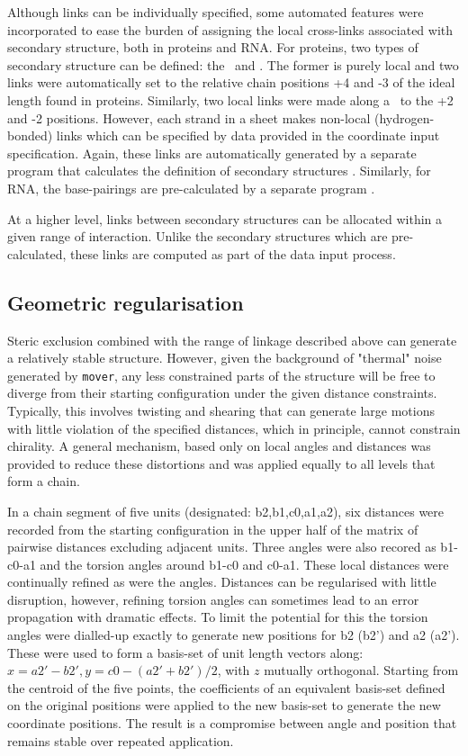 Although links can be individually specified, some automated features were 
incorporated to ease the burden of assigning the local cross-links associated with
secondary structure, both in proteins and RNA.  For proteins, two types of secondary
structure can be defined: the \AH\ and \BS.   The former is purely local and two
links were automatically set to the relative chain positions +4 and -3 of the 
ideal length found in proteins.  Similarly, two local links were made along a \Bs\
to the +2 and -2 positions.   However, each strand in a sheet makes non-local (hydrogen-bonded)
links which can be specified by data provided in the coordinate input specification.
Again, these links are automatically generated by a separate program that calculates the
definition of secondary structures \cite{TaylorWR01a}.    Similarly, for RNA, the base-pairings are
pre-calculated by a separate program \cite{HofackerIL03}.

At a higher level, links between secondary structures can be allocated within a
given range of interaction.   Unlike the secondary structures which are pre-calculated,
these links are computed as part of the data input process.

\subsection{Geometric regularisation}

Steric exclusion combined with the range of linkage described above can generate a
relatively stable structure.   However, given the background of "thermal" noise generated by {\tt mover}, 
any less constrained parts of the structure will be free to diverge from their starting
configuration under the given distance constraints.  Typically, this involves twisting
and shearing that can generate large motions with little violation of the specified
distances, which in principle, cannot constrain chirality.  A general mechanism,
based only on local angles and distances was provided to reduce these distortions
and was applied equally to all levels that form a chain.

In a chain segment of five units (designated: b2,b1,c0,a1,a2), six distances were
recorded from the starting configuration in the upper half of the matrix of pairwise
distances excluding adjacent units.  Three angles were also recored as b1-c0-a1 and
the torsion angles around b1-c0 and c0-a1.   These local distances were continually
refined as were the angles.  Distances can be regularised with little disruption,
however, refining torsion angles can sometimes lead to an error propagation
with dramatic effects.  To limit the potential for this the torsion angles were
dialled-up exactly to generate new positions for b2 (b2') and a2 (a2').   These were
used to form a basis-set of unit length vectors along: $x = a2'-b2', y = c0-(a2'+b2')/2$,
with $z$ mutually orthogonal.   Starting from the centroid of the five points, the 
coefficients of an equivalent basis-set defined on the original positions were applied
to the new basis-set to generate the new coordinate positions.  The result is a
compromise between angle and position that remains stable over repeated application.

